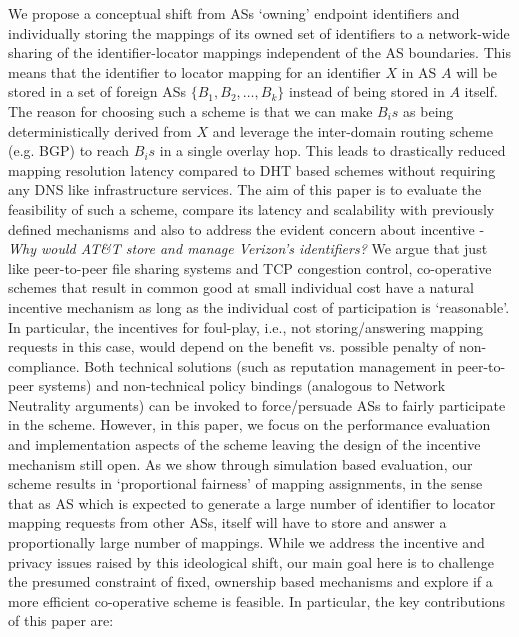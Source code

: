 We propose a conceptual shift from ASs `owning' endpoint identifiers and individually storing the mappings of its owned set of identifiers to a network-wide sharing of the identifier-locator mappings independent of the AS boundaries. This means that the identifier to locator mapping for an identifier $X$ in AS $A$ will be stored in a set of foreign ASs $\{B_1, B_2, \ldots, B_k\}$ instead of being stored in $A$ itself. The reason for choosing such a scheme is that we can make $B_is$ as being deterministically derived from $X$ and leverage the inter-domain routing scheme (e.g. BGP) to reach $B_is$ in a single overlay hop. This leads to drastically reduced mapping resolution latency compared to DHT based schemes without requiring any DNS like infrastructure services. The aim of this paper is to evaluate the feasibility of such a scheme, compare its latency and scalability with previously defined mechanisms and also to address the evident concern about incentive - \emph{Why would AT\&T store and manage Verizon's identifiers?} We argue that just like peer-to-peer file sharing systems and TCP congestion control, co-operative schemes that result in common good at small individual cost have a natural incentive mechanism as long as the individual cost of participation is `reasonable'. In particular, the incentives for foul-play, i.e., not storing/answering mapping requests in this case, would depend on the benefit vs. possible penalty of non-compliance. Both technical solutions (such as reputation management in peer-to-peer systems) and non-technical policy bindings (analogous to Network Neutrality arguments) can be invoked to force/persuade ASs to fairly participate in the scheme. However, in this paper, we focus on the performance evaluation and implementation aspects of the scheme leaving the design of the incentive mechanism still open. As we show through simulation based evaluation, our scheme results in `proportional fairness' of mapping assignments, in the sense that as AS which is expected to generate a large number of identifier to locator mapping requests from other ASs, itself will have to store and answer a proportionally large number of mappings. While we address the incentive and privacy issues raised by this ideological shift, our main goal here is to challenge the presumed constraint of fixed, ownership based mechanisms and explore if a more efficient co-operative scheme is feasible. In particular, the key contributions of this paper are: 




